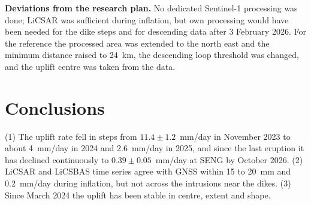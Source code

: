 \documentclass[10pt,a4paper,twocolumn]{article}
\begin{document}
\textbf{Deviations from the research plan.} No dedicated Sentinel-1 processing was done; LiCSAR was sufficient during inflation, but own processing would have been needed for the dike steps and for descending data after 3 February 2026. For the reference the processed area was extended to the north east and the minimum distance raised to 24~km, the descending loop threshold was changed, and the uplift centre was taken from the data.

\section{Conclusions}

(1) The uplift rate fell in steps from $11.4 \pm 1.2$~mm/day in November 2023 to about 4~mm/day in 2024 and 2.6~mm/day in 2025, and since the last eruption it has declined continuously to $0.39 \pm 0.05$~mm/day at SENG by October 2026. (2) LiCSAR and LiCSBAS time series agree with GNSS within 15 to 20~mm and 0.2~mm/day during inflation, but not across the intrusions near the dikes. (3) Since March 2024 the uplift has been stable in centre, extent and shape.



\end{document}
